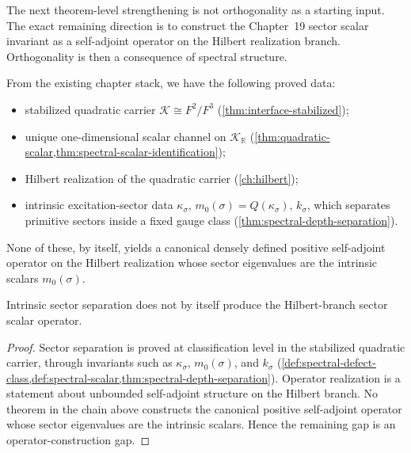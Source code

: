 The next theorem-level strengthening is not orthogonality as a starting
input.
The exact remaining direction is to construct the Chapter~19 sector scalar
invariant as a self-adjoint operator on the Hilbert realization branch.
Orthogonality is then a consequence of spectral structure.

From the existing chapter stack, we have the following proved data:
\begin{itemize}
\item stabilized quadratic carrier
      \(\mathcal K\cong F^2/F^3\)
      (\cref{thm:interface-stabilized});
\item unique one-dimensional scalar channel on
      \(\mathcal K_{\mathbb R}\)
      (\cref{thm:quadratic-scalar,thm:spectral-scalar-identification});
\item Hilbert realization of the quadratic carrier
      (\cref{ch:hilbert});
\item intrinsic excitation-sector data
      \(\kappa_\sigma\),
      \(m_0(\sigma)=Q(\kappa_\sigma)\),
      \(k_\sigma\), which separates primitive sectors inside a fixed gauge
      class (\cref{thm:spectral-depth-separation}).
\end{itemize}

None of these, by itself, yields a canonical densely defined positive
self-adjoint operator on the Hilbert realization whose sector eigenvalues
are the intrinsic scalars \(m_0(\sigma)\).

\begin{proposition}
\label{prop:matter-realization-gap}
Intrinsic sector separation does not by itself produce the Hilbert-branch
sector scalar operator.
\end{proposition}

\begin{proof}
Sector separation is proved at classification level in the stabilized
quadratic carrier, through invariants such as
\(\kappa_\sigma\), \(m_0(\sigma)\), and \(k_\sigma\)
(\cref{def:spectral-defect-class,def:spectral-scalar,thm:spectral-depth-separation}).
Operator realization is a statement about unbounded self-adjoint structure on
the Hilbert branch.
No theorem in the chain above constructs the canonical positive
self-adjoint operator whose sector eigenvalues are the intrinsic scalars.
Hence the remaining gap is an operator-construction gap.
\end{proof}

